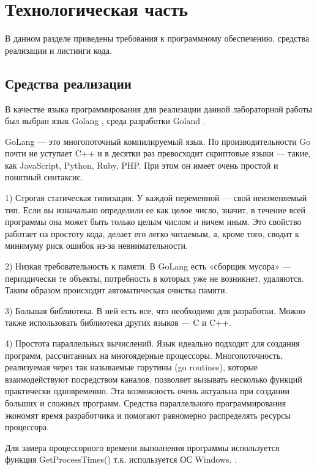 \chapter{Технологическая часть}

В данном разделе приведены требования к программному обеспечению, средства реализации и листинги кода.

\section{Средства реализации}

В качестве языка программирования для реализации данной лабораторной работы был выбран язык Golang \cite{golang}, среда разработки Goland \cite{goland}. 

GoLang — это многопоточный компилируемый язык. По производительности Go почти не уступает C++ и в десятки раз превосходит скриптовые языки — такие, как JavaScript, Python, Ruby, PHP. При этом он имеет очень простой и понятный синтаксис. 

    1) Строгая статическая типизация. У каждой переменной — свой неизменяемый тип. Если вы изначально определили ее как целое число, значит, в течение всей программы она может быть только целым числом и ничем иным. Это свойство работает на простоту кода, делает его легко читаемым, а, кроме того, сводит к минимуму риск ошибок из-за невнимательности.
    
    2) Низкая требовательность к памяти. В GoLang есть «сборщик мусора» — периодически те объекты, потребность в которых уже не возникнет, удаляются. Таким образом происходит автоматическая очистка памяти.
    
    3) Большая библиотека. В ней есть все, что необходимо для разработки. Можно также использовать библиотеки других языков — C и C++.
    
    4) Простота параллельных вычислений. Язык идеально подходит для создания программ, рассчитанных на многоядерные процессоры. Многопоточность, реализуемая через так называемые горутины (go routines), которые взаимодействуют посредством каналов, позволяет вызывать несколько функций практически одновременно. Эта возможность очень актуальна при создании больших и сложных программ. Средства параллельного программирования экономят время разработчика и помогают равномерно распределять ресурсы процессора.
    
Для замера процессорного времени выполнения программы используется функция GetProcessTimes() т.к. используется ОС Windows. \cite{GetProcessTimes}.

